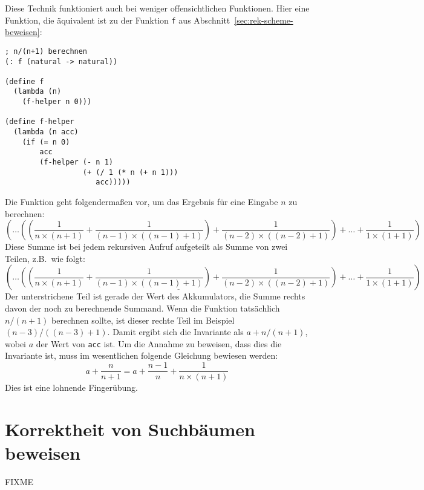%
Diese Technik funktioniert auch bei weniger offensichtlichen
Funktionen.  Hier eine Funktion, die äquivalent ist zu der Funktion
\lstinline{f} aus Abschnitt~\ref{sec:rek-scheme-beweisen}:

\begin{lstlisting}
; n/(n+1) berechnen
(: f (natural -> natural))

(define f
  (lambda (n)
    (f-helper n 0)))

(define f-helper
  (lambda (n acc)
    (if (= n 0)
        acc
        (f-helper (- n 1)
                  (+ (/ 1 (* n (+ n 1)))
                     acc)))))
\end{lstlisting}
%
Die Funktion geht folgendermaßen vor, um das Ergebnis für eine Eingabe
$n$ zu berechnen:
%
\begin{displaymath}
  (\ldots ((\frac{1}{n \times (n + 1)}
  + \frac{1}{(n - 1) \times ((n - 1) + 1)})
  + \frac{1}{(n - 2) \times ((n - 2) + 1)})
  + \ldots
  + \frac{1}{1 \times (1 + 1)})
\end{displaymath}
%
Diese Summe ist bei jedem rekursiven Aufruf aufgeteilt als Summe von
zwei Teilen, z.B.\ wie folgt:
%
\begin{displaymath}
  (\ldots \underline{((\frac{1}{n \times (n + 1)}
  + \frac{1}{(n - 1) \times ((n - 1) + 1)})
  + \frac{1}{(n - 2) \times ((n - 2) + 1)})}
  + \ldots
  + \frac{1}{1 \times (1 + 1)})
\end{displaymath}
%
Der unterstrichene Teil ist gerade der Wert des Akkumulators, die
Summe rechts davon der noch zu berechnende Summand.  
Wenn die Funktion tatsächlich $n/(n+1)$ berechnen sollte, ist dieser
rechte Teil im Beispiel $(n-3)/((n-3)+1)$.  Damit ergibt
sich die Invariante als $a + n/(n+1)$, wobei $a$ der Wert von
\lstinline{acc} ist.  Um die Annahme zu beweisen, dass dies die Invariante
ist, muss im wesentlichen folgende Gleichung bewiesen werden:
\[a+ \frac{n}{n+1} = a + \frac{n-1}{n} + \frac{1}{n\times (n+1)}\]
Dies ist eine lohnende Fingerübung.

\section{Korrektheit von Suchbäumen beweisen}

FIXME

